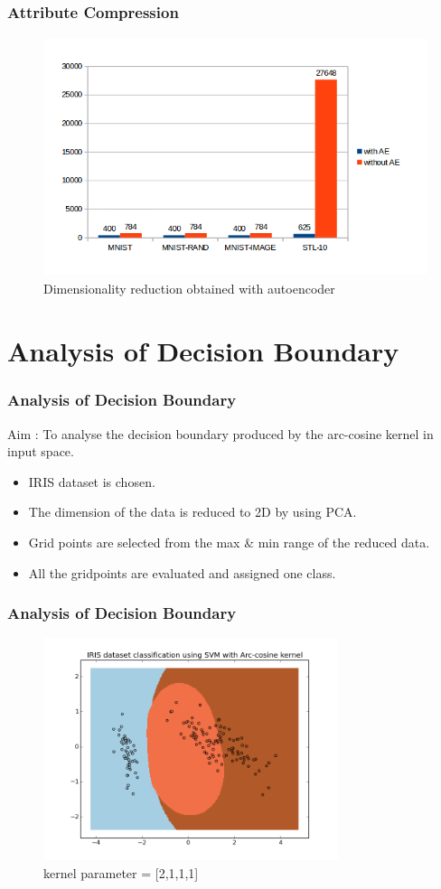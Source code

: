 \documentclass{beamer}
\begin{document}
\begin{frame}
\frametitle{Attribute Compression}
\begin{figure}
\includegraphics[width=0.8\linewidth, height=7cm]{figures/att_compression}
\caption{Dimensionality reduction obtained with autoencoder}
\end{figure}
\end{frame}

\section{Analysis of Decision Boundary}

\begin{frame}
\frametitle{Analysis of Decision Boundary}
Aim : To analyse the  decision boundary produced by the arc-cosine kernel in input space. 
\begin{itemize}
\item IRIS dataset is chosen.
\item The dimension of the data is reduced to 2D by using PCA.
\item Grid points are selected from the max \& min range of the reduced data.
\item All the gridpoints are evaluated and assigned one class.  
\end{itemize}
\end{frame}


\begin{frame}
\frametitle{Analysis of Decision Boundary}
\begin{figure}
\includegraphics[width=0.7\linewidth, height=6.5cm]{figures/db1_2111}
\caption{kernel parameter = [2,1,1,1]}
\end{figure}
\end{frame}
\end{document}
